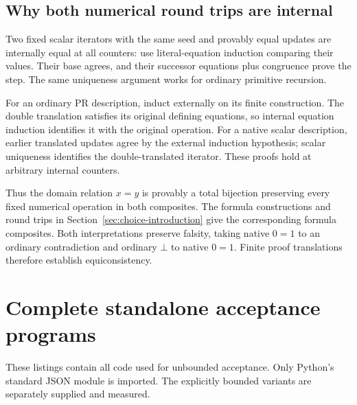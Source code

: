 \documentclass[11pt,letterpaper]{article}
\theoremstyle{definition}\newtheorem{definition}[theorem]{Definition}
\theoremstyle{remark}\newtheorem{remark}[theorem]{Remark}
\begin{document}
\subsection{Why both numerical round trips are internal}

Two fixed scalar iterators with the same seed and provably equal
updates are internally equal at all counters: use literal-equation
induction comparing their values. Their base agrees, and their
successor equations plus congruence prove the step. The same
uniqueness argument works for ordinary primitive recursion.

For an ordinary PR description, induct externally on its finite
construction. The double translation satisfies its original
defining equations, so internal equation induction identifies it
with the original operation. For a native scalar description,
earlier translated updates agree by the external induction
hypothesis; scalar uniqueness identifies the double-translated
iterator. These proofs hold at arbitrary internal counters.

Thus the domain relation $x=y$ is provably a total bijection
preserving every fixed numerical operation in both composites.
The formula constructions and round trips in
Section~\ref{sec:choice-introduction} give the corresponding formula
composites. Both interpretations preserve falsity, taking native
$0=1$ to an ordinary contradiction and ordinary $\bot$ to native
$0=1$. Finite proof translations therefore establish equiconsistency.


\clearpage


\section{Complete standalone acceptance programs}
These listings contain all code used for unbounded acceptance. Only Python's standard JSON module is imported. The explicitly bounded variants are separately supplied and measured.
\end{document}
